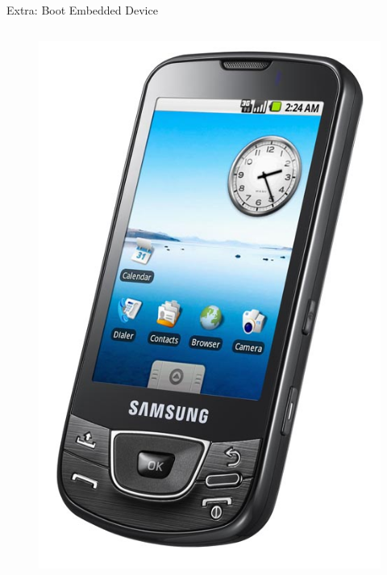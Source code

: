 \documentclass{workshop}
\begin{document}
\begin{frame}{Extra: Boot Embedded Device}
\begin{columns}
\begin{column}[l]{0.45\textwidth}
\begin{figure}
         \includegraphics[scale=0.65]{img/phone.jpg}
      \end{figure}
    \end{column}
  \end{columns}
\end{frame}
\end{document}
